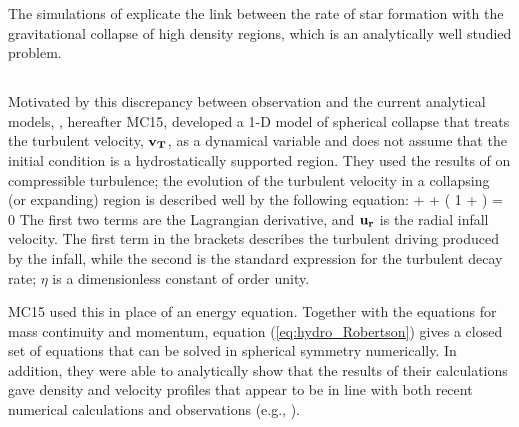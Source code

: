 \documentclass[../dissertation.tex]{subfiles}
\begin{document}
The simulations of  \citet{2015ApJ...800...49L} explicate the link between the rate of star formation with the gravitational collapse of high density regions, which  is  an analytically well studied problem. 

\subsection{\citet{2015ApJ...804...44M}} \label{MC15_model}

Motivated by this discrepancy between observation and the current analytical models,
\citet{2015ApJ...804...44M}, hereafter MC15, developed a 1-D model of
spherical collapse that treats the turbulent velocity, $\mathbf{v_T}$, as a dynamical variable and
does not assume that the initial condition is a hydrostatically supported region. 
They used the results of \citet{2012ApJ...750L..31R} on compressible turbulence; the evolution 
of the turbulent velocity in a collapsing (or expanding) region is described well by the following equation:
%
\be
{} + \ur {} 
+ \left( 1 + \eta \frac{\vt}{\ur} \right)  = 0
\label{eq:hydro_Robertson}
\ee
%
The first two terms are the Lagrangian derivative, and $\mathbf{u_r}$ is the radial infall velocity. The first term in the brackets 
describes the turbulent driving produced by the infall, while the second 
is the standard expression for the turbulent decay rate;  $\eta$ is a dimensionless constant of order unity.

MC15 used this in place of an energy equation. Together with the
equations for mass continuity and momentum, equation (\ref{eq:hydro_Robertson}) gives a
closed set of equations that can be solved in spherical symmetry
numerically. In addition, they were able to analytically show that the
results of their calculations gave density and velocity profiles that
appear to be in line with both recent numerical calculations
\citep{2015ApJ...800...49L} and observations (e.g.,
\citealt{1995ApJ...446..665C,1997ApJ...476..730P}).
\end{document}
